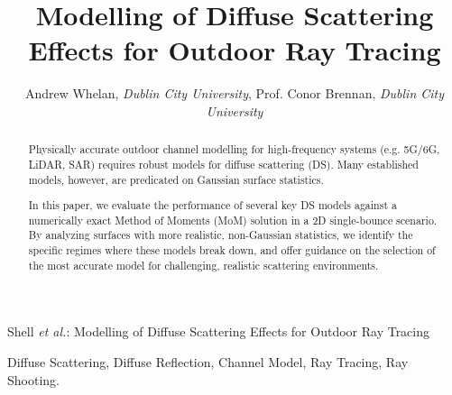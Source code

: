 \documentclass[lettersize,journal]{IEEEtran}
\DeclareRobustCommand{\pos}{\vec{r}}
\DeclareRobustCommand{\eFreq}{\mathbf{E}}
\DeclareRobustCommand{\hFreq}{\mathbf{H}}
\begin{document}
\newcommand{\txSymbol}{T}
\newcommand{\rxSymbol}{R}
\newcommand{\wallSymbol}{S}
\newcommand{\txPos}{\pos_{\txSymbol}}
\newcommand{\rxPos}{\pos_{\rxSymbol}}
\newcommand{\wallPos}{\pos_{\wallSymbol}}
\newcommand{\sourcePower}{P_{\txSymbol}}
\newcommand{\wavenum}{k}
\newcommand{\wallSurf}{S}
\newcommand{\numWallPts}{N_{\wallSurf}}
\newcommand{\numRxPts}{N_{\rxSymbol}}
\newcommand{\eRx}{\eFreq_{\rxSymbol}}
\newcommand{\eWall}{\eFreq_{\wallSurf}}
\newcommand{\hWall}{\hFreq_{\wallSurf}}
\newcommand{\imp}{\eta}
\newcommand{\surfCurrent}{J_{\wallSurf}}
\newcommand{\numBasisFuncs}{N_b}
\newcommand{\coeffs}{\mathbf{a}}
\newcommand{\exciteVec}{\mathbf{V}}
\newcommand{\wallLen}{l_{\text{wall} }}
\newcommand{\rxLen}{l_{\text{Rx} }}
\newcommand{\wavelen}{\lambda}
\newcommand{\meanLength}{\bar{L}}
\newcommand{\defeq}{\overset{\mathclap{\text{def}} }{=}}
\newcommand{\numSurfs}{N_{l}}
\newcommand{\numRays}{N_{\text{rays} }}
\newcommand{\fresnel}{\Gamma}
\newcommand{\curv}{\kappa}
\newcommand{\bigLength}{\check{L}}%
\newcommand{\specLen}{l_{\text{spec} }}
\newcommand{\divergenceFactor}{\mathcal{D}}
\newcommand{\incAngles}{N_{\theta_i}}
\newcommand{\scatAngles}{N_{\theta_s}}
\newcommand{\heightFine}{h_{\text{fine}}}
\newcommand{\heightCoarse}{h_{\text{coarse}}}
\newcommand{\heightAging}{h_{\text{aging}}}
\newcommand{\ampFine}{A_{\text{fine}}}
\newcommand{\freqFine}{f_{\text{fine}}}
\newcommand{\ampCoarse}{\langle A_{\text{coarse}} \rangle}
\newcommand{\freqCoarse}{\langle f_{\text{coarse}} \rangle}
\title{Modelling of Diffuse Scattering Effects for Outdoor Ray Tracing}
\author{Andrew Whelan, \emph{Dublin City University}, Prof. Conor Brennan,
        \emph{Dublin City University}}
%
{Shell \MakeLowercase{\textit{et al.}}: Modelling of Diffuse Scattering Effects for
Outdoor Ray Tracing}

\maketitle
\begin{abstract}
   Physically accurate outdoor channel modelling for high-frequency systems (e.g.
   5G/6G, LiDAR, SAR) requires robust models for diffuse scattering (DS). Many
   established models, however, are predicated on Gaussian surface statistics. 

   In this paper, we evaluate the performance of several key DS models against a
   numerically exact Method of Moments (MoM) solution in a 2D single-bounce scenario.
   By analyzing surfaces with more realistic, non-Gaussian statistics, we identify
   the specific regimes where these models break down, and offer guidance on the
   selection of the most accurate model for challenging, realistic scattering
   environments.
\end{abstract}
\begin{IEEEkeywords}
Diffuse Scattering, Diffuse Reflection, Channel Model, Ray Tracing, Ray Shooting.
\end{IEEEkeywords}
\end{document}
